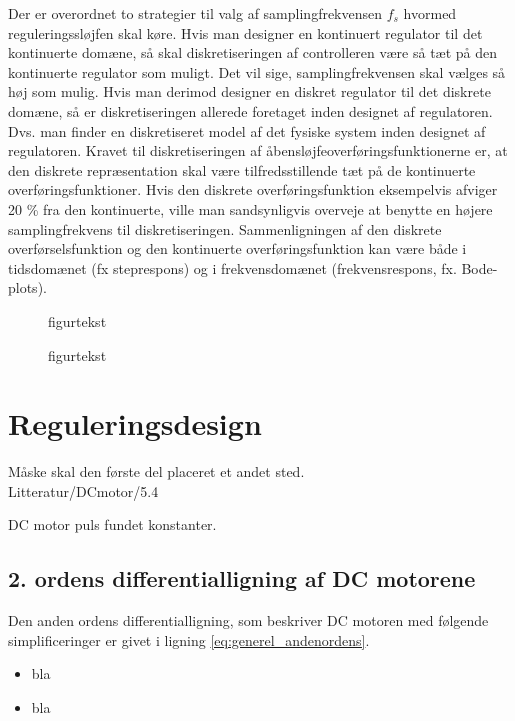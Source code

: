 Der er overordnet to strategier til valg af samplingfrekvensen \(f_s\) hvormed
reguleringssløjfen skal køre.
Hvis man designer en kontinuert regulator til det kontinuerte domæne, så
skal diskretiseringen af controlleren være så tæt på den kontinuerte regulator som muligt.
Det vil sige, samplingfrekvensen skal vælges så høj som mulig.
Hvis man derimod designer en diskret regulator til det diskrete domæne,
så er diskretiseringen allerede foretaget inden designet af regulatoren.
Dvs. man finder en diskretiseret model af det fysiske system inden designet af regulatoren.
Kravet til diskretiseringen af åbensløjfeoverføringsfunktionerne er, at den diskrete repræsentation
skal være tilfredsstillende tæt på de kontinuerte overføringsfunktioner.
Hvis den diskrete overføringsfunktion eksempelvis afviger 20 \% fra den kontinuerte, ville man
sandsynligvis overveje at benytte en højere samplingfrekvens til diskretiseringen.
Sammenligningen af den diskrete overførselsfunktion og den kontinuerte overføringsfunktion
kan være både i tidsdomænet (fx steprespons) og i frekvensdomænet (frekvensrespons, fx. Bode-plots).




\begin{figure}[!th]
\centering
\begin{tikzpicture}[auto, node distance=2.6cm,>=latex']

\end{tikzpicture}
\caption[tekst i indholdsfortegnelsen]{figurtekst}
\label{fig:}
\end{figure}

\begin{figure}[!th]
\centering
\begin{tikzpicture}[auto, node distance=2.6cm,>=latex']

\end{tikzpicture}
\caption[tekst i indholdsfortegnelsen]{figurtekst}
\label{fig:}
\end{figure}\section{Reguleringsdesign}
\label{sec:kontrollerdeign}
Måske skal den første del placeret et andet sted. \\

Litteratur/DCmotor/5.4



DC motor puls fundet konstanter.
\subsection{2. ordens differentialligning af DC motorene}
Den anden ordens differentialligning, som beskriver DC motoren med følgende simplificeringer er givet i ligning \ref{eq:generel_andenordens}.
\begin{itemize}
\item bla 
\item bla 
\end{itemize}

